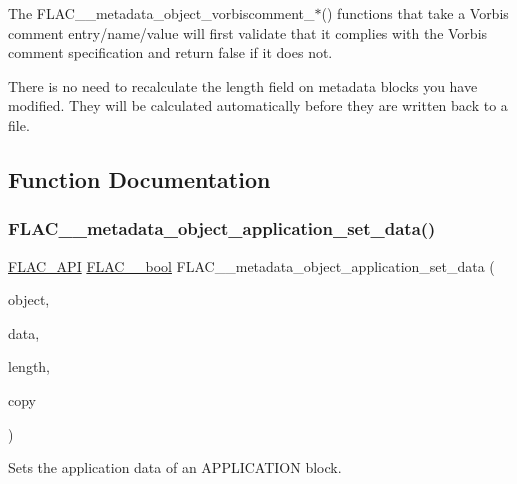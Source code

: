 The F\+L\+A\+C\+\_\+\+\_\+metadata\+\_\+object\+\_\+vorbiscomment\+\_\+$\ast$() functions that take a Vorbis comment entry/name/value will first validate that it complies with the Vorbis comment specification and return false if it does not.

There is no need to recalculate the length field on metadata blocks you have modified. They will be calculated automatically before they are written back to a file. 

\subsection{Function Documentation}
\mbox{\label{group__flac__metadata__object_ga8f7fbaa68d5637e2409a053ec2ff744d}} 
\subsubsection{\texorpdfstring{FLAC\_\_metadata\_object\_application\_set\_data()}{FLAC\_\_metadata\_object\_application\_set\_data()}}
{\footnotesize\ttfamily \mbox{\hyperlink{group__flac__export_ga56ca07df8a23310707732b1c0007d6f5}{F\+L\+A\+C\+\_\+\+A\+PI}} \mbox{\hyperlink{ordinals_8h_a95103469f1cbd78b8cf250194985b34e}{F\+L\+A\+C\+\_\+\+\_\+bool}} F\+L\+A\+C\+\_\+\+\_\+metadata\+\_\+object\+\_\+application\+\_\+set\+\_\+data (\begin{DoxyParamCaption}\item[{\mbox{\hyperlink{struct_f_l_a_c_____stream_metadata}{F\+L\+A\+C\+\_\+\+\_\+\+Stream\+Metadata}} $\ast$}]{object,  }\item[{\mbox{\hyperlink{ordinals_8h_a5eb569b12d5b047cdacada4d57924ee3}{F\+L\+A\+C\+\_\+\+\_\+byte}} $\ast$}]{data,  }\item[{unsigned}]{length,  }\item[{\mbox{\hyperlink{ordinals_8h_a95103469f1cbd78b8cf250194985b34e}{F\+L\+A\+C\+\_\+\+\_\+bool}}}]{copy }\end{DoxyParamCaption})}

Sets the application data of an A\+P\+P\+L\+I\+C\+A\+T\+I\+ON block.

